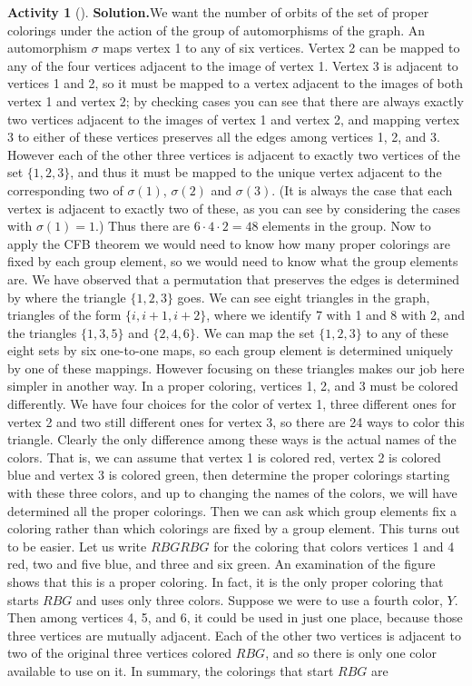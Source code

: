 \documentclass[10pt,]{book}
\theoremstyle{plain}
\theoremstyle{definition}
\newtheorem{activity}[project]{Activity}
\numberwithin{equation}{chapter}
\begin{document}
\begin{activity}[]
\textbf{Solution.}\quad We want the number of orbits of the set of proper colorings under the action of the group of automorphisms of the graph. An automorphism \(\sigma\) maps vertex 1 to any of six vertices. Vertex 2 can be mapped to any of the four vertices adjacent to the image of vertex 1. Vertex 3 is adjacent to vertices 1 and 2, so it must be mapped to a vertex adjacent to the images of both vertex 1 and vertex 2; by checking cases you can see that there are always exactly two vertices adjacent to the images of vertex 1 and vertex 2, and mapping vertex 3 to either of these vertices preserves all the edges among vertices 1, 2, and 3. However each of the other three vertices is adjacent to exactly two vertices of the set \(\{1,2,3\}\), and thus it must be mapped to the unique vertex adjacent to the corresponding two of \(\sigma(1)\), \(\sigma(2)\) and \(\sigma(3)\). (It is always the case that each vertex is adjacent to exactly two of these, as you can see by considering the cases with \(\sigma(1)=1\).) Thus there are \(6\cdot4\cdot2=48\) elements in the group. Now to apply the CFB theorem we would need to know how many proper colorings are fixed by each group element, so we would need to know what the group elements are. We have observed that a permutation that preserves the edges is determined by where the triangle \(\{1,2,3\}\) goes. We can see eight triangles in the graph, triangles of the form \(\{i,i+1,i+2\}\), where we identify 7 with 1 and 8 with 2, and the triangles \(\{1,3,5\}\) and \(\{2,4,6\}\). We can map the set \(\{1,2,3\}\) to any of these eight sets by six one-to-one maps, so each group element is determined uniquely by one of these mappings. However focusing on these triangles makes our job here simpler in another way. In a proper coloring, vertices 1, 2, and 3 must be colored differently. We have four choices for the color of vertex 1, three different ones for vertex 2 and two still different ones for vertex 3, so there are 24 ways to color this triangle. Clearly the only difference among these ways is the actual names of the colors. That is, we can assume that vertex 1 is colored red, vertex 2 is colored blue and vertex 3 is colored green, then determine the proper colorings starting with these three colors, and up to changing the names of the colors, we will have determined all the proper colorings. Then we can ask which group elements fix a coloring rather than which colorings are fixed by a group element. This turns out to be easier. Let us write \(RBGRBG\) for the coloring that colors vertices 1 and 4 red, two and five blue, and three and six green. An examination of the figure shows that this is a proper coloring. In fact, it is the only proper coloring that starts \(RBG\) and uses only three colors. Suppose we were to use a fourth color, \(Y\). Then among vertices 4, 5, and 6, it could be used in just one place, because those three vertices are mutually adjacent. Each of the other two vertices is adjacent to two of the original three vertices colored \(RBG\), and so there is only one color available to use on it. In summary, the colorings that start \(RBG\) are \leavevmode%

\end{activity}
\end{document}
